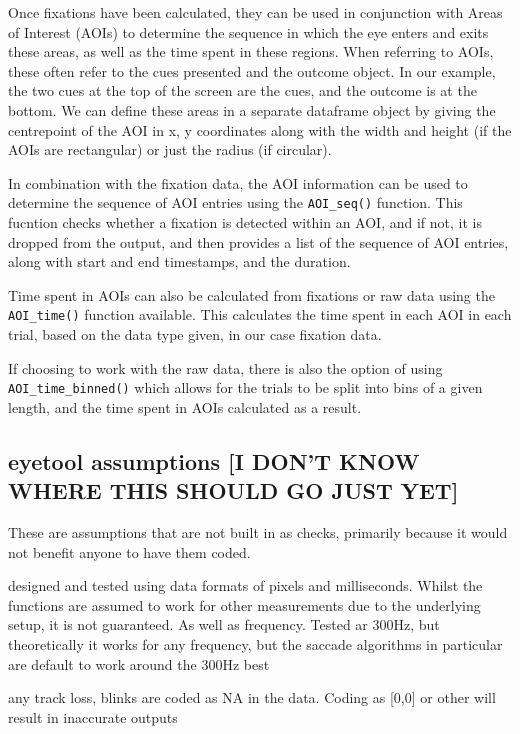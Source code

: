 \documentclass[
  man,
  floatsintext,
  longtable,
  nolmodern,
  notxfonts,
  notimes,
  colorlinks=true,linkcolor=blue,citecolor=blue,urlcolor=blue]{apa7}
\begin{document}
Once fixations have been calculated, they can be used in conjunction
with Areas of Interest (AOIs) to determine the sequence in which the eye
enters and exits these areas, as well as the time spent in these
regions. When referring to AOIs, these often refer to the cues presented
and the outcome object. In our example, the two cues at the top of the
screen are the cues, and the outcome is at the bottom. We can define
these areas in a separate dataframe object by giving the centrepoint of
the AOI in x, y coordinates along with the width and height (if the AOIs
are rectangular) or just the radius (if circular).

In combination with the fixation data, the AOI information can be used
to determine the sequence of AOI entries using the \texttt{AOI\_seq()}
function. This fucntion checks whether a fixation is detected within an
AOI, and if not, it is dropped from the output, and then provides a list
of the sequence of AOI entries, along with start and end timestamps, and
the duration.

Time spent in AOIs can also be calculated from fixations or raw data
using the \texttt{AOI\_time()} function available. This calculates the
time spent in each AOI in each trial, based on the data type given, in
our case fixation data.

If choosing to work with the raw data, there is also the option of using
\texttt{AOI\_time\_binned()} which allows for the trials to be split
into bins of a given length, and the time spent in AOIs calculated as a
result.

\subsection{eyetool assumptions {[}I DON'T KNOW WHERE THIS SHOULD GO
JUST
YET{]}}\label{eyetool-assumptions-i-dont-know-where-this-should-go-just-yet}

These are assumptions that are not built in as checks, primarily because
it would not benefit anyone to have them coded.

designed and tested using data formats of pixels and milliseconds.
Whilst the functions are assumed to work for other measurements due to
the underlying setup, it is not guaranteed. As well as frequency. Tested
ar 300Hz, but theoretically it works for any frequency, but the saccade
algorithms in particular are default to work around the 300Hz best

any track loss, blinks are coded as NA in the data. Coding as {[}0,0{]}
or other will result in inaccurate outputs
\end{document}
